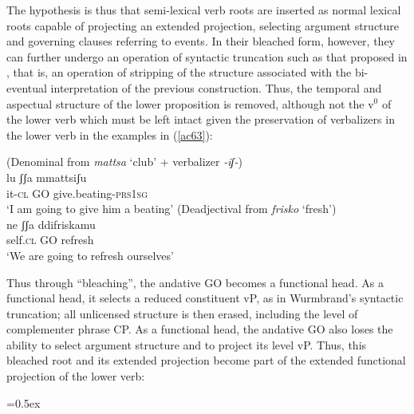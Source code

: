 \documentclass[output=paper]{langscibook}
\begin{document}
The hypothesis is thus that semi-lexical verb roots are inserted as normal lexical roots capable of projecting an extended projection, selecting argument structure and governing clauses referring to events.  In their bleached form, however, they can further undergo an operation of syntactic truncation such as that proposed in \citet{wurmbrand2014a, wurmbrand2015, wurmbrand2017verb}, that is, an operation of stripping of the structure associated with the bi-eventual interpretation of the previous construction. Thus, the temporal and aspectual structure of the lower proposition is removed, although not the v$^0$ of the lower verb which must be left intact given the preservation of verbalizers in the lower verb in the examples in (\ref{ac63}):

\ea \label{ac63}
\ea (Denominal from \textit{mattsa} ‘club’ + verbalizer \textit{-iʃ-})\label{ac63a}\\
\gll lu     ʃʃa  mmattsiʃu\\
     it-\textsc{cl} GO  give.beating-\textsc{prs}\textsc{1sg}\\
 \glt ‘I am going to give him a beating’
\ex (Deadjectival from \textit{frisko} ‘fresh’)\\
\label{ac63b}\gll ne    ʃʃa   ddifriskamu\\
 self.\textsc{cl}  GO  refresh\\
 \glt ‘We are going to refresh ourselves’
    \z
\z

Thus through “bleaching”, the andative GO becomes a functional head. As a functional head, it selects a reduced constituent vP, as in Wurmbrand's syntactic truncation; all unlicensed structure is then erased, including the level of complementer  phrase CP. As a functional head, the andative GO also loses the ability to select argument structure and to project its level vP. Thus, this bleached root and its extended projection become part of the extended functional projection of the lower verb:

\ea\tabcolsep=0.5ex
\z
\end{document}
